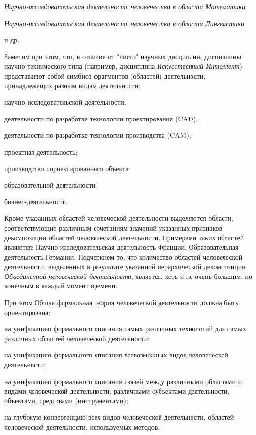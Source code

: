 {\begin{scnitemize}
\begin{scnitemizeii}
    	\item \textit{Научно-исследовательская деятельность человечества в области Математики}
    	\item \textit{Научно-исследовательская деятельность человечества в области Лингвистики}
    	\item и др.
    \end{scnitemizeii}    
    Заметим при этом, что, в отличие от "чисто"{} научных дисциплин, дисциплины научно-технического типа (например, дисциплина \textit{Искусственный Интеллект}) представляют собой симбиоз фрагментов (областей) деятельности, принадлежащих разным видам деятельности:
    \begin{scnitemizeii}
        \item научно-исследовательской деятельности;
        \item деятельности по разработке технологии проектирования (CAD);
        \item деятельности по разработке технологии производства (CAM);
        \item проектная деятельность;
        \item производство спроектированного объекта;
        \item образовательной деятельности;
        \item бизнес-деятельности.
    \end{scnitemizeii}
    Кроме указанных областей человеческой деятельности выделяются области, соответствующие различным сочетаниям значений указанных признаков декомпозиции областей человеческой деятельности. Примерами таких областей являются: Научно-исследовательская деятельность Франции, Образовательная деятельность Германии. Подчеркнем то, что количество областей человеческой деятельности, выделенных в результате указанной иерархической декомпозиции \textit{Объединенной человеческой деятельности}, является, хоть и не очень большим, но конечным в каждый момент времени.
\end{scnitemize}\bigskip

При этом Общая формальная теория человеческой деятельности должна быть ориентирована:
\begin{scnitemize}
    \item на унификацию формального описания самых различных технологий для самых различных областей человеческой деятельности;
    \item на унификацию формального описания всевозможных видов человеческой деятельности;
    \item на унификацию формального описания связей между различными областями и видами человеческой деятельности, различными субъектами деятельности, объектами, средствами (инструментами);
    \item на глубокую конвергенцию всех видов человеческой деятельности, областей человеческой деятельности, используемых методов.
\end{scnitemize}}
